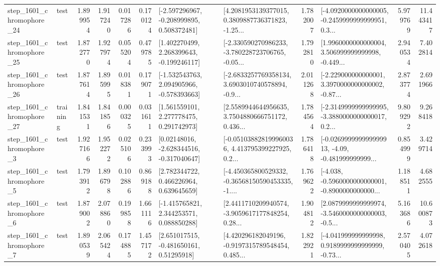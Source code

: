 \begin{tabular}{llrrrrllrlrr}
 step\_1601\_chromophore\_24 &      test &      1.899954 &    1.917240 &      0.017286 &  0.170124 &   [-2.597296967, -0.208999895, 0.508372481] &  [4.2081953139377015, 0.3809887736371823, -1.25... &       1.782007 &  [-4.0920000000000005, -0.2459999999999951, 0.3... &            5.979769 &         11.443417 \\
 step\_1601\_chromophore\_25 &      test &      1.872770 &    1.927974 &      0.055204 &  0.479785 &    [1.402270499, 2.268399643, -0.199246117] &  [-2.330590270986233, -3.780228723706765, -0.05... &       1.792810 &  [1.9960000000000004, 3.506999999999998, -0.449... &            2.940534 &          7.402814 \\
 step\_1601\_chromophore\_26 &      test &      1.877614 &    1.895995 &      0.018381 &  0.179071 &   [-1.532543763, 2.094905966, -0.578393663] &  [-2.6833257769358134, 3.6903010740578894, -0.9... &       2.011268 &  [-2.229000000000001, 3.3970000000000002, -0.87... &            2.873774 &          2.691966 \\
 step\_1601\_chromophore\_27 &  training &      1.841531 &    1.841856 &      0.000325 &  0.031611 &     [1.561559101, 2.277778475, 0.291742973] &  [2.5589944644956635, 3.7504880666751172, 0.436... &       1.784564 &  [-2.3149999999999995, -3.3880000000000017, 0.2... &            9.809292 &          9.268418 \\
  step\_1601\_chromophore\_3 &      test &      1.927166 &    1.952272 &      0.025106 &  0.233993 &    [0.02148016, -2.628344516, -0.317040647] &  [-0.051038828199960036, 4.413795399227925, 0.2... &       1.786418 &  [-0.026999999999999913, -4.09, -0.481999999999... &            0.854999 &          3.429714 \\
  step\_1601\_chromophore\_5 &      test &      1.793912 &    1.896798 &      0.102886 &  0.869188 &     [2.782344722, 0.466226964, 0.639645659] &  [-4.450365800529332, -0.36568150590453335, -1.... &       1.769622 &  [-4.038, -0.5960000000000001, -0.8900000000000... &            1.188511 &          4.682555 \\
  step\_1601\_chromophore\_6 &      test &      1.879002 &    2.078860 &      0.199858 &  1.661116 &    [-1.415765821, 2.344253571, 0.088850288] &  [2.4411710209940574, -3.9059617177848254, 0.28... &       1.904812 &  [2.0879999999999974, -3.5460000000000003, -0.5... &            5.163686 &         10.600873 \\
  step\_1601\_chromophore\_7 &      test &      1.890539 &    2.065424 &      0.174885 &  1.457172 &     [2.651017515, -0.481650161, 0.51295918] &  [4.420296182049196, -0.9197315789548454, 0.485... &       1.822921 &  [-4.041999999999998, 0.9189999999999999, -0.73... &            2.570405 &          4.072618 \\

\end{tabular}
